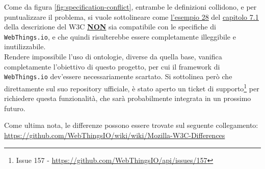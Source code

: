 \documentclass[12pt,a4paper,openright,oneside]{report}
\begin{document}
Come da figura \ref{fig:specification-conflict}, entrambe le definizioni collidono, e per puntualizzare il problema, si vuole sottolineare come \href{https://www.w3.org/TR/wot-thing-description/#example-28}{\ul{l'esempio 28}} del \href{https://www.w3.org/TR/wot-thing-description/#semantic-annotations}{\ul{capitolo 7.1}} della descrizione del W3C \textbf{\uline{NON}} sia compatibile con le specifiche di \texttt{WebThings.io}, e che quindi risulterebbe essere completamente illeggibile e inutilizzabile.\\

Rendere impossibile l'uso di ontologie, diverse da quella base, vanifica completamente l'obiettivo di questo progetto, per cui il framework di \texttt{WebThings.io} dev'essere necessariamente scartato. Si sottolinea però che direttamente sul suo repository ufficiale, è stato aperto un ticket di supporto\footnote{Issue 157 - \url{https://github.com/WebThingsIO/api/issues/157}} per richiedere questa funzionalità, che sarà probabilmente integrata in un prossimo futuro.

Come ultima nota, le differenze possono essere trovate sul seguente collegamento: \url{https://github.com/WebThingsIO/wiki/wiki/Mozilla-W3C-Differences}

\end{document}
